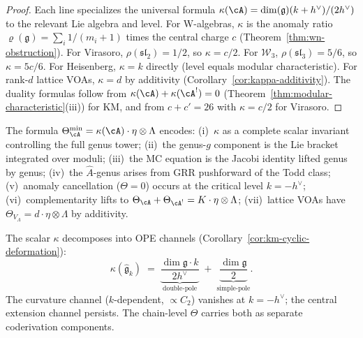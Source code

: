 \begin{proof}
Each line specializes the universal formula
$\kappa(\cA) = \dim(\mathfrak{g})(k+h^\vee)/(2h^\vee)$ to the
relevant Lie algebra and level.  For W-algebras, $\kappa$ is
the anomaly ratio $\varrho(\mathfrak{g}) = \sum_i 1/(m_i+1)$ times
the central charge $c$
(Theorem~\ref{thm:wn-obstruction}).
For Virasoro, $\rho(\mathfrak{sl}_2) = 1/2$, so $\kappa = c/2$.
For $\mathcal{W}_3$, $\rho(\mathfrak{sl}_3) = 5/6$, so
$\kappa = 5c/6$.  For Heisenberg, $\kappa = k$ directly
(level equals modular characteristic).  For rank-$d$ lattice VOAs,
$\kappa = d$ by additivity
(Corollary~\ref{cor:kappa-additivity}).
The duality formulas follow from $\kappa(\cA) + \kappa(\cA^!) = 0$
(Theorem~\ref{thm:modular-characteristic}(iii)) for KM, and from
$c + c' = 26$ with $\kappa = c/2$ for Virasoro.
\end{proof}

\begin{remark}
\label{rem:theta-interpretation}
The formula $\Theta_{\cA}^{\min} = \kappa(\cA)\cdot\eta\otimes\Lambda$
encodes: (i)~$\kappa$ as a complete scalar invariant controlling the
full genus tower; (ii)~the genus-$g$ component is the Lie bracket
integrated over moduli; (iii)~the MC equation is the Jacobi identity
lifted genus by genus; (iv)~the $\hat{A}$-genus arises from GRR
pushforward of the Todd class; (v)~anomaly cancellation ($\Theta=0$)
occurs at the critical level $k=-h^\vee$; (vi)~complementarity lifts
to $\Theta_{\cA}+\Theta_{\cA^!}=K\cdot\eta\otimes\Lambda$;
(vii)~lattice VOAs have $\Theta_{V_\Lambda}=d\cdot\eta\otimes\Lambda$
by additivity.
\end{remark}

\begin{remark}
\label{rem:theta-two-channel}
The scalar $\kappa$ decomposes into OPE channels
(Corollary~\ref{cor:km-cyclic-deformation}):
\[
\kappa(\widehat{\mathfrak{g}}_k)
\;=\;
\underbrace{\frac{\dim\mathfrak{g}\cdot k}{2h^\vee}}_{\text{double-pole}}
\;+\;
\underbrace{\frac{\dim\mathfrak{g}}{2}}_{\text{simple-pole}}.
\]
The curvature channel ($k$-dependent, $\propto C_2$) vanishes at
$k=-h^\vee$; the central extension channel persists.
The chain-level $\Theta$ carries both as separate coderivation
components.
\end{remark}

